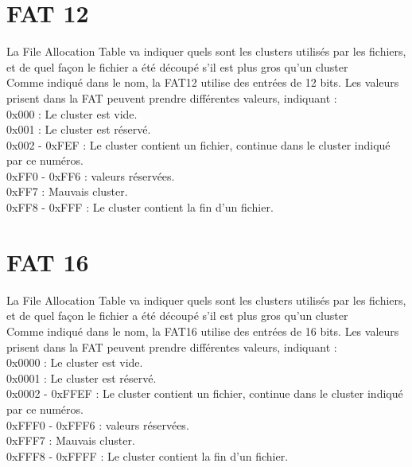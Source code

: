 \documentclass[11pt]{report}
\begin{document}
\section{FAT 12}
La File Allocation Table va indiquer quels sont les clusters utilisés par les fichiers, et de quel façon le fichier a été découpé s'il est plus gros qu'un cluster \\
Comme indiqué dans le nom, la FAT12 utilise des entrées de 12 bits.
Les valeurs prisent dans la FAT peuvent prendre différentes valeurs, indiquant : \\
0x000 : Le cluster est vide.\\
0x001 : Le cluster est réservé.\\
0x002 - 0xFEF : Le cluster contient un fichier, continue dans le cluster indiqué par ce numéros.\\
0xFF0 - 0xFF6 : valeurs réservées.\\
0xFF7 : Mauvais cluster.\\
0xFF8 - 0xFFF : Le cluster contient la fin d'un fichier.\\
\section{FAT 16}
La File Allocation Table va indiquer quels sont les clusters utilisés par les fichiers, et de quel façon le fichier a été découpé s'il est plus gros qu'un cluster \\
Comme indiqué dans le nom, la FAT16 utilise des entrées de 16 bits.
Les valeurs prisent dans la FAT peuvent prendre différentes valeurs, indiquant : \\
0x0000 : Le cluster est vide.\\
0x0001 : Le cluster est réservé.\\
0x0002 - 0xFFEF : Le cluster contient un fichier, continue dans le cluster indiqué par ce numéros.\\
0xFFF0 - 0xFFF6 : valeurs réservées.\\
0xFFF7 : Mauvais cluster.\\
0xFFF8 - 0xFFFF : Le cluster contient la fin d'un fichier.\\
\end{document}
